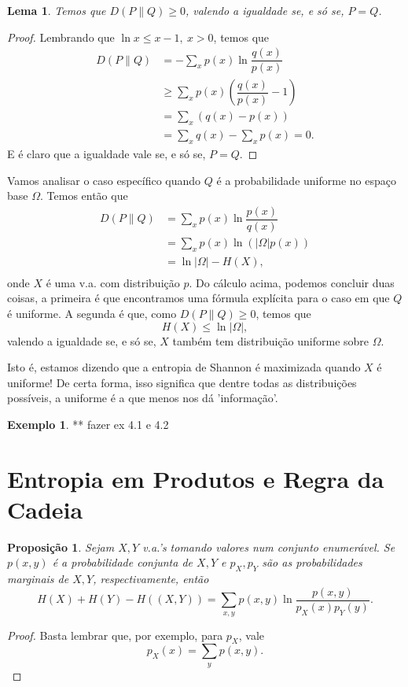 \documentclass[12pt,a4paper,oneside]{book}
\newtheorem{proposition}[theorem]{Proposi\c{c}\~ao}
\newtheorem{lemma}[theorem]{Lema}
\theoremstyle{definition}
\newtheorem{example}[theorem]{Exemplo}
\theoremstyle{remark}
\numberwithin{equation}{section}
\begin{document}
\begin{lemma}
Temos que $D(P\|Q)\geq 0$, valendo a igualdade se, e só se, $P=Q$.
\end{lemma}
\begin{proof}
Lembrando que $\ln x \leq x-1,\ x>0$, temos que
\begin{align*}
D(P\|Q) &= -\sum_x p(x)\ln \dfrac{q(x)}{p(x)}\\
&\geq \sum_x p(x) \left(\dfrac{q(x)}{p(x)}-1 \right)\\
& = \sum_x (q(x)-p(x))\\
& = \sum_x q(x)-\sum_x p(x) = 0.
\end{align*}
E é claro que a igualdade vale se, e só se,  $P=Q$.
\end{proof}

\begin{tcolorbox}[colback = yellow!60]
Vamos analisar o caso específico quando $Q$ é a probabilidade uniforme no espaço base $\Omega$. Temos então que
\begin{align*}
D(P\|Q) &= \sum_x p(x)\ln \dfrac{p(x)}{q(x)}\\
&=\sum_x p(x)\ln\left( |\Omega|p(x)\right)\\
&=\ln|\Omega| - H(X),\\
\end{align*}
onde $X$ é uma v.a. com distribuição $p$.
Do cálculo acima, podemos concluir duas coisas, a primeira é que encontramos uma fórmula explícita para o caso em que $Q$ é uniforme. A segunda é que, como $D(P\|Q)\geq 0$, temos que
$$H(X)\leq \ln|\Omega|, $$
valendo a igualdade se, e só se, $X$ também tem distribuição uniforme sobre $\Omega.$

Isto é, estamos dizendo que a entropia de Shannon é maximizada quando $X$ é uniforme! De certa forma, isso significa que dentre todas as distribuições possíveis, a uniforme é a que menos nos dá 'informação'.
\end{tcolorbox}

\begin{example}
** fazer ex 4.1 e 4.2
\end{example}
\newpage
\section{Entropia em Produtos e Regra da Cadeia}

\begin{proposition}
Sejam $X,Y$ v.a.'s tomando valores num conjunto enumerável. Se $p(x,y)$ é a probabilidade conjunta de $X,Y$ e $p_X,p_Y$ são as probabilidades marginais de $X,Y$, respectivamente, então
$$H(X) + H(Y) - H( (X,Y) ) = \sum_{x,y} p(x,y) \ln \dfrac{p(x,y)}{p_X(x)p_Y(y)}.$$
\end{proposition}
\begin{proof}
Basta lembrar que, por exemplo, para $p_X$, vale
$$p_X(x) = \sum_y p(x,y). $$
\end{proof}
\end{document}
